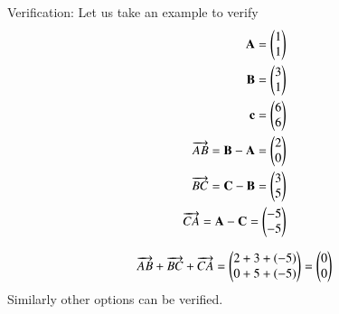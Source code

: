 \documentclass[journal,12pt,twocolumn]{IEEEtran}
\begin{document}
\begin{enumerate}
Verification: Let us take an example to verify 
\begin{align}
\mathbf{A} = \begin{pmatrix}1\\1\end{pmatrix} \\
\mathbf{B} = \begin{pmatrix}3\\1\end{pmatrix} \\
\mathbf{c} = \begin{pmatrix}6\\6\end{pmatrix} \\
\overrightarrow{AB} = \mathbf{B} - \mathbf{A} = \begin{pmatrix}2\\0\end{pmatrix} \\
\overrightarrow{BC} = \mathbf{C} - \mathbf{B} = \begin{pmatrix}3\\5\end{pmatrix} \\
\overrightarrow{CA} = \mathbf{A} - \mathbf{C} = \begin{pmatrix}-5\\-5\end{pmatrix} 
\end{align}

\begin{align}
\overrightarrow{AB}+\overrightarrow{BC}+\overrightarrow{CA} = \begin{pmatrix}2+3+(-5) \\ 0+5+(-5)\end{pmatrix} = \begin{pmatrix}0 \\0\end{pmatrix}
\end{align}
Similarly other options can be verified.

\end{enumerate}
\end{document}
